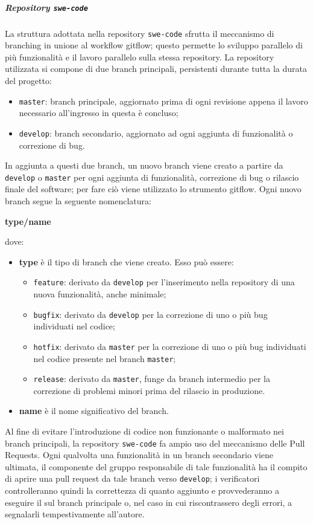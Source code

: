 \documentclass[../norme-di-progetto.tex]{subfiles}
\begin{document}
\subparagraph{Repository \texttt{swe-code}}
La struttura adottata nella repository \texttt{swe-code} sfrutta il meccanismo di branching in unione al workflow gitflow; questo permette lo sviluppo parallelo di più funzionalità e il lavoro parallelo sulla stessa repository. La repository utilizzata si compone di due branch principali, persistenti durante tutta la durata del progetto:
\begin{itemize}
  \item \texttt{master}: branch principale, aggiornato prima di ogni revisione appena il lavoro necessario all'ingresso in questa è concluso;
  \item \texttt{develop}: branch secondario, aggiornato ad ogni aggiunta di funzionalità o correzione di bug.
\end{itemize}
In aggiunta a questi due branch, un nuovo branch viene creato a partire da \texttt{develop} o \texttt{master} per ogni aggiunta di funzionalità, correzione di bug o rilascio finale del software; per fare ciò viene utilizzato lo strumento gitflow. Ogni nuovo branch segue la seguente nomenclatura:
\begin{center}
  \centering
  \textbf{type/name}
\end{center} dove:
\begin{itemize}
  \item \textbf{type} è il tipo di branch che viene creato. Esso può essere:
  \begin{itemize}
    \item \texttt{feature}: derivato da \texttt{develop} per l'inserimento nella repository di una nuova funzionalità, anche minimale;
    \item \texttt{bugfix}: derivato da \texttt{develop} per la correzione di uno o più bug individuati nel codice;
    \item \texttt{hotfix}: derivato da \texttt{master} per la correzione di uno o più bug individuati nel codice presente nel branch \texttt{master};
    \item \texttt{release}: derivato da \texttt{master}, funge da branch intermedio per la correzione di problemi minori prima del rilascio in produzione.
  \end{itemize}
  \item \textbf{name} è il nome significativo del branch.
\end{itemize}
Al fine di evitare l'introduzione di codice non funzionante o malformato nei branch principali, la repository \texttt{swe-code} fa ampio uso del meccanismo delle Pull Requests. Ogni qualvolta una funzionalità in un branch secondario viene ultimata, il componente del gruppo responsabile di tale funzionalità ha il compito di aprire una pull request da tale branch verso \texttt{develop}; i verificatori controlleranno quindi la correttezza di quanto aggiunto e provvederanno a eseguire il  sul branch principale o, nel caso in cui riscontrassero degli errori, a segnalarli tempestivamente all'autore.
\end{document}
